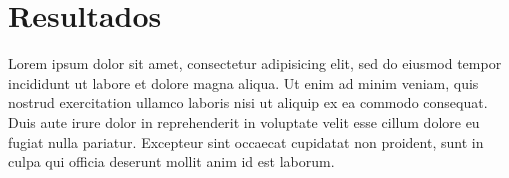 \section{Resultados}


Lorem ipsum dolor sit amet, consectetur adipisicing elit, sed do eiusmod
tempor incididunt ut labore et dolore magna aliqua. Ut enim ad minim veniam,
quis nostrud exercitation ullamco laboris nisi ut aliquip ex ea commodo
consequat. Duis aute irure dolor in reprehenderit in voluptate velit esse
cillum dolore eu fugiat nulla pariatur. Excepteur sint occaecat cupidatat non
proident, sunt in culpa qui officia deserunt mollit anim id est laborum.